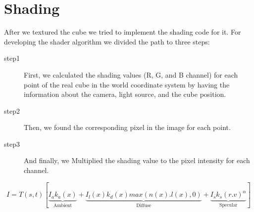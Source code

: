 \section{Shading}
After we textured the cube we tried to implement the shading code for it. For developing the shader algorithm we divided the path to three steps:
\begin{description}
  \item[step1] First, we calculated the shading values (R, G, and B channel) for each point of the real cube in the world coordinate system by having the information about the camera, light source, and the cube position.
  \item[step2] Then, we found the corresponding pixel in the image for each point.
  \item[step3] And finally, we Multiplied the shading value to the pixel intensity for each channel.
\end{description}

\begin{equation}
I=T(s,t)[
\underbrace{
I_{a}k_{a}(x)
}_\text{Ambient}
+
\underbrace{
I_{l}(x)k_{d}(x)max(n(x).l(x),0)
}_\text{Diffuse}
+
\underbrace{
I_{s}k_{s}(r.v)^\alpha
  }_\text{Specular}
]
	\label{eq:phongReflection}
\end{equation}
